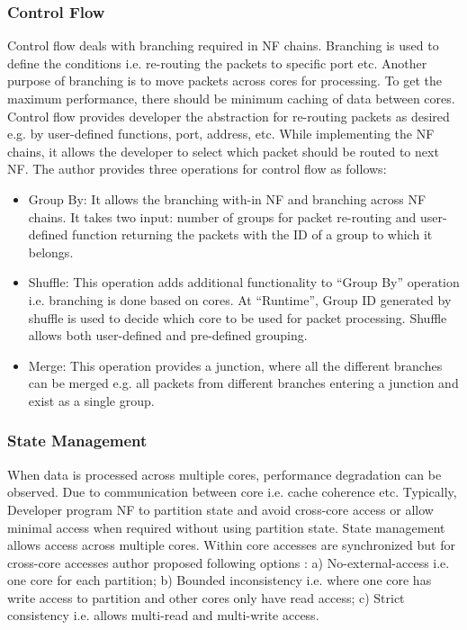 \documentclass[10pt, a4paper, conference]{IEEEtran}
\begin{document}
\subsubsection{Control Flow}
Control flow deals with branching required in NF chains. Branching is used to define the conditions i.e. re-routing the packets to specific port etc. Another purpose of branching is to move packets across cores for processing. To get the maximum performance, there should be minimum caching of data between cores. Control flow provides developer the abstraction for re-routing packets as desired e.g. by user-defined functions, port, address, etc. While implementing the NF chains, it allows the developer to select which packet should be routed to next NF. The author provides three operations for control flow \cite{Panda2016} as follows: 
\begin{itemize}
\item Group By: It allows the branching with-in NF and branching across NF chains. It takes two input: number of groups for packet re-routing and user-defined function returning the packets with the ID of a group to which it belongs.
\item Shuffle: This operation adds additional functionality to “Group By” operation i.e. branching is done based on cores. At “Runtime”, Group ID generated by shuffle is used to decide which core to be used for packet processing. Shuffle allows both user-defined and pre-defined grouping. 
\item Merge: This operation provides a junction, where all the different branches can be merged e.g. all packets from different branches entering a junction and exist as a single group.
\end{itemize}
\subsubsection{State Management}
When data is processed across multiple cores, performance degradation can be observed. Due to communication between core i.e. cache coherence etc. Typically, Developer program NF to partition state and avoid cross-core access or allow minimal access when required without using partition state. State management allows access across multiple cores. Within core accesses are synchronized but for cross-core accesses author proposed following options \cite{Panda2016}: a) No-external-access i.e. one core for each partition; b) Bounded inconsistency\cite{Panda2017} i.e. where one core has write access to partition and other cores only have read access; c) Strict consistency i.e. allows multi-read and multi-write access.
\end{document}
